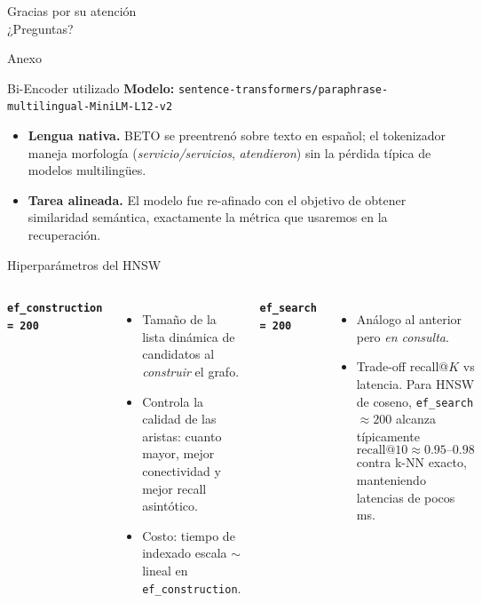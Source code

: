 \documentclass[10pt,aspectratio=169]{beamer}
\begin{document}
\begin{frame}[standout]
	Gracias por su atención \\
	¿Preguntas?
\end{frame}

\appendix

\begin{frame}[standout]
	Anexo
\end{frame}

\begin{frame}{Bi-Encoder utilizado}
	\textbf{Modelo:} \texttt{sentence-transformers/paraphrase-multilingual-MiniLM-L12-v2}

	\begin{itemize}
		\item \textbf{Lengua nativa.} BETO se preentrenó sobre texto en
		      español; el tokenizador maneja morfología
		      (\emph{servicio/servicios}, \emph{atendieron}) sin la pérdida
		      típica de modelos multilingües.

		\item \textbf{Tarea alineada.} El modelo fue re-afinado con el objetivo
		      de obtener similaridad semántica, exactamente la métrica
		      que usaremos en la recuperación.
	\end{itemize}
\end{frame}

\begin{frame}{Hiperparámetros del HNSW}
	\begin{columns}[T]
		\textbf{\texttt{ef\_construction = 200}}
		\begin{itemize}
			\item Tamaño de la lista dinámica de candidatos al \emph{construir}
			      el grafo.
			\item Controla la calidad de las aristas: cuanto mayor, mejor
			      conectividad y mejor recall asintótico.
			\item Costo: tiempo de indexado escala $\sim$ lineal en
			      \texttt{ef\_construction}.
		\end{itemize}

		\textbf{\texttt{ef\_search = 200}}
		\begin{itemize}
			\item Análogo al anterior pero \emph{en consulta}.
			\item Trade-off recall@$K$ vs latencia. Para HNSW de coseno,
			      \texttt{ef\_search}$\approx 200$ alcanza típicamente
			      \[
				      \text{recall@10} \approx 0.95\text{--}0.98
			      \]
			      contra k-NN exacto, manteniendo latencias de pocos ms.
		\end{itemize}
	\end{columns}
\end{frame}
\end{document}
